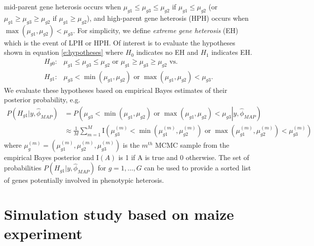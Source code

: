 \documentclass[useAMS,usenatbib,referee]{biom}
\begin{document}
mid-parent gene heterosis occurs when $\mu_{g1}\le \mu_{g3}\le \mu_{g2}$ if $\mu_{g1}\le \mu_{g2}$ (or $\mu_{g1}\ge \mu_{g3}\ge \mu_{g2}$ if $\mu_{g1}\ge \mu_{g2}$), and high-parent gene heterosis (HPH) occurs when $\max(\mu_{g1},\mu_{g2}) < \mu_{g3}$. For simplicity, we define \emph{extreme gene heterosis} (EH) which is the event of LPH or HPH. Of interest is to evaluate the hypotheses shown in equation \eqref{e:hypotheses} where $H_0$ indicates no EH and $H_1$ indicates EH. 
\begin{align}
\label{e:hypotheses}
H_{g0}:&\mu_{g1}\le \mu_{g3}\le \mu_{g2} \mbox{ or } \mu_{g1}\ge \mu_{g3}\ge \mu_{g2} \mbox{\ \ vs.\ \ } \nonumber \\
H_{g1}:&\mu_{g3}< \min(\mu_{g1},\mu_{g2}) \mbox{ or } \max(\mu_{g1},\mu_{g2}) < \mu_{g3}.
\end{align}
We evaluate these hypotheses based on empirical Bayes estimates of their posterior probability, e.g. 
\begin{align}
P\left(H_{g1}|y, \hat{\phi}_{MAP}\right) &= P\left(\left.\mu_{g3}< \min(\mu_{g1},\mu_{g2}) \mbox{ or } \max(\mu_{g1},\mu_{g2}) < \mu_{g3}\right| y, \hat{\phi}_{MAP}\right) \nonumber \\
&\approx \frac{1}{M} \sum_{m=1}^M \mathrm{I}\left(\mu_{g3}^{(m)}< \min\left(\mu_{g1}^{(m)},\mu_{g2}^{(m)}\right) \mbox{ or } \max\left(\mu_{g1}^{(m)},\mu_{g2}^{(m)}\right) < \mu_{g3}^{(m)}\right) \label{e:probs}
\end{align}
where $\mu_g^{(m)} = \left(\mu_{g1}^{(m)},\mu_{g2}^{(m)},\mu_{g3}^{(m)}\right)$ is the $m^{th}$ MCMC sample from the empirical Bayes posterior and $\mathrm{I}(A)$ is 1 if A is true and 0 otherwise. The set of probabilities $P\left(H_{g1}|y, \hat{\phi}_{MAP}\right)$ for $g=1,\ldots,G$ can be used to provide a sorted list of genes potentially involved in phenotypic heterosis. 


\section{Simulation study based on maize experiment}
\label{s:simulation}

% 
\end{document}
